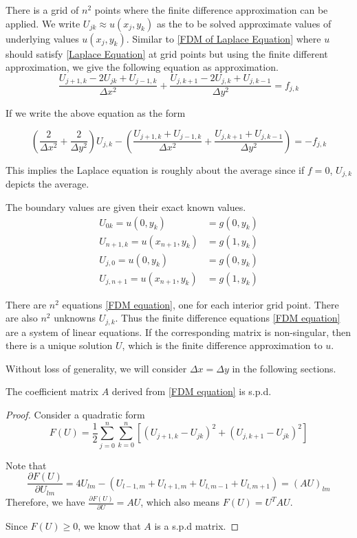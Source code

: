 	There is a grid of $n^2$ points where the finite difference approximation can be applied. We write $U_{jk} \approx u(x_j, y_k)$ as the to be solved approximate values of underlying values $u(x_j, y_k)$. Similar to \eqref{FDM of Laplace Equation} where $u$ should satisfy \eqref{Laplace Equation} at grid points but using the finite different approximation, we give the following equation as approximation.
	\begin{equation}
		\frac{U_{j + 1, k} - 2U_{jk} + U_{j - 1, k}}{\Delta x^2} + \frac{U_{j, k+ 1} - 2U_{j, k} + U_{j, k - 1}}{\Delta y^2} = f_{j, k}
		\label{FDM equation}
	\end{equation}
	
	If we write the above equation as the form
	
	\begin{equation}
		(\frac{2}{\Delta x^2} + \frac{2}{\Delta y^2})U_{j, k} - (\frac{U_{j + 1, k} + U_{j - 1, k}}{\Delta x^2} + \frac{U_{j, k + 1} + U_{j, k - 1}}{\Delta y^2}) = -f_{j, k}
	\end{equation}
	
	This implies the Laplace equation is roughly about the average since if $f = 0$, $U_{j, k}$ depicts the average.
	
	The boundary values are given their exact known values.
	\begin{align*}
		U_{0k} = u(0, y_k) &= g(0, y_k)\\
		U_{n + 1, k} = u(x_{n + 1}, y_k) &= g(1, y_k)\\
		U_{j, 0} = u(0, y_k) &= g(0, y_k)\\
		U_{j, n + 1} = u(x_{n + 1}, y_k) &= g(1, y_k)
	\end{align*}
	
	There are $n^2$ equations \eqref{FDM equation}, one for each interior grid point. There are also $n^2$ unknowns $U_{j, k}$. Thus the finite difference equations \eqref{FDM equation} are a system of linear equations. If the corresponding matrix is non-singular, then there is a unique solution $U$, which is the finite difference approximation to $u$.
	
	Without loss of generality, we will consider $\Delta x = \Delta y$ in the following sections.
	
	\begin{theorem}
		The coefficient matrix $A$ derived from \eqref{FDM equation} is s.p.d.
	\end{theorem}
	
	\begin{proof}
		Consider a quadratic form
		$$F(U) = \frac{1}{2}\sum_{j=0}^n\sum_{k=0}^n[(U_{j+1,k} - U_{jk})^2 + (U_{j,k+1} - U_{jk})^2]$$
		
		Note that $$\frac{ \partial F(U) }{\partial U_{lm}} = 4U_{lm} - (U_{l-1,m} + U_{l+1,m} + U_{l,m-1} + U_{l,m+1}) = (AU)_{lm}$$
		Therefore, we have $\frac{ \partial F(U) }{\partial U} = AU$, which also means $F(U) = U^TAU$.
		
		Since $F(U) \geq 0$, we know that $A$ is a s.p.d matrix.
	\end{proof}
	
